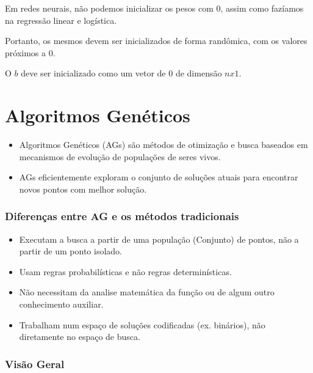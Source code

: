 \documentclass[12pt]{article}
\providecommand{\tightlist}{%
\setlength{\itemsep}{0pt}\setlength{\parskip}{0pt}}
\begin{document}
Em redes neurais, não podemos inicializar os pesos com \(0\), assim como
fazíamos na regressão linear e logística.

Portanto, os mesmos devem ser inicializados de forma randômica, com os
valores próximos a 0.

O \(b\) deve ser inicializado como um vetor de \(0\) de dimensão
\(nx1\).

\hypertarget{algoritmos-genuxe9ticos}{%
\section{\texorpdfstring{\textbf{Algoritmos
Genéticos}}{Algoritmos Genéticos}}\label{algoritmos-genuxe9ticos}}

\begin{itemize}
\tightlist
\item
  Algoritmos Genéticos (AGs) são métodos de otimização e busca baseados
  em mecanismos de evolução de populações de seres vivos.
\item
  AGs eficientemente exploram o conjunto de soluções atuais para
  encontrar novos pontos com melhor solução.
\end{itemize}

\hypertarget{diferenuxe7as-entre-ag-e-os-muxe9todos-tradicionais}{%
\subsubsection{Diferenças entre AG e os métodos
tradicionais}\label{diferenuxe7as-entre-ag-e-os-muxe9todos-tradicionais}}

\begin{itemize}
\tightlist
\item
  Executam a busca a partir de uma população (Conjunto) de pontos, não a
  partir de um ponto isolado.
\item
  Usam regras probabilísticas e não regras determinísticas.
\item
  Não necessitam da analise matemática da função ou de algum outro
  conhecimento auxiliar.
\item
  Trabalham num espaço de soluções codificadas (ex. binários), não
  diretamente no espaço de busca.
\end{itemize}

\hypertarget{visuxe3o-geral}{%
\subsubsection{Visão Geral}\label{visuxe3o-geral}}
\end{document}
